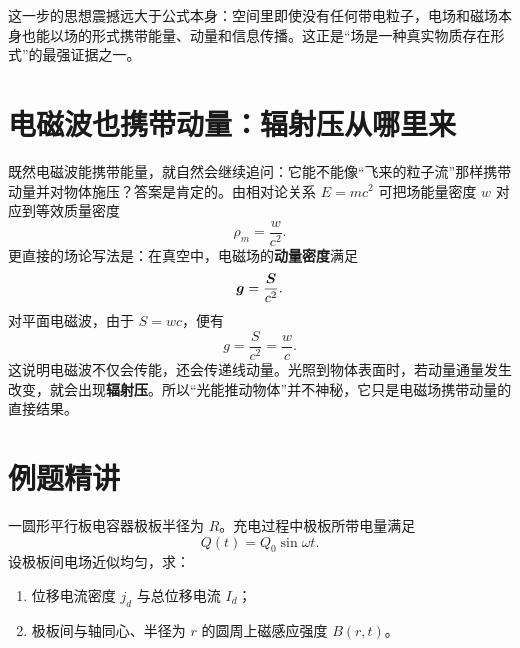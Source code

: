 \documentclass[lang=cn,11pt]{elegantbook}
\begin{document}
\begin{remark}
这一步的思想震撼远大于公式本身：空间里即使没有任何带电粒子，电场和磁场本身也能以场的形式携带能量、动量和信息传播。这正是“场是一种真实物质存在形式”的最强证据之一。
\end{remark}

\section{电磁波也携带动量：辐射压从哪里来}

既然电磁波能携带能量，就自然会继续追问：它能不能像“飞来的粒子流”那样携带动量并对物体施压？答案是肯定的。由相对论关系 \(E=mc^2\) 可把场能量密度 \(w\) 对应到等效质量密度
\[
\rho_m=\frac{w}{c^2}.
\]
更直接的场论写法是：在真空中，电磁场的\textbf{动量密度}满足
\[
\vb*{g}=\frac{\vb*{S}}{c^2}.
\]
对平面电磁波，由于 \(S=wc\)，便有
\[
g=\frac{S}{c^2}=\frac{w}{c}.
\]
这说明电磁波不仅会传能，还会传递线动量。光照到物体表面时，若动量通量发生改变，就会出现\textbf{辐射压}。所以“光能推动物体”并不神秘，它只是电磁场携带动量的直接结果。

\section{例题精讲}

\begin{example}[充电平行板电容器中的位移电流与环向磁场]
一圆形平行板电容器极板半径为 \(R\)。充电过程中极板所带电量满足
\[
Q(t)=Q_0\sin\omega t.
\]
设极板间电场近似均匀，求：
\begin{enumerate}
  \item 位移电流密度 \(j_d\) 与总位移电流 \(I_d\)；
  \item 极板间与轴同心、半径为 \(r\) 的圆周上磁感应强度 \(B(r,t)\)。
\end{enumerate}
\end{example}
\end{document}
